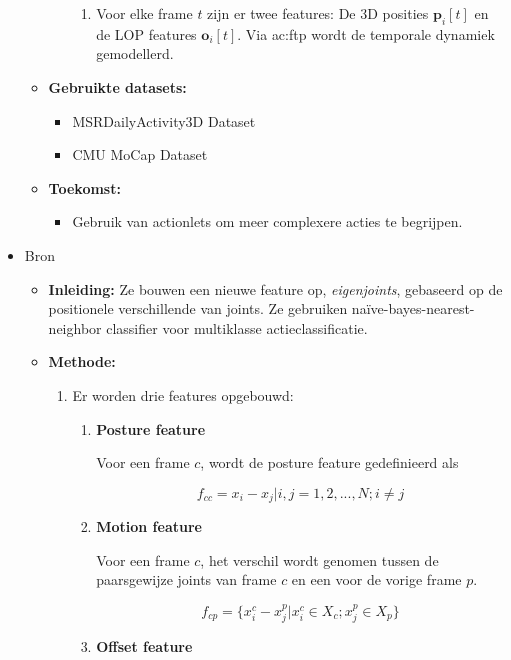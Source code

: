 \begin{itemize}
\begin{itemize}
\begin{enumerate}
\begin{enumerate}
 				\item Voor elke frame $t$ zijn er twee features: De 3D posities $\textbf{p}_i[t]$ en de LOP features $\textbf{o}_i[t]$. Via \gls{ac:ftp} wordt de temporale dynamiek gemodellerd.
 			\end{enumerate} 
		\end{enumerate}
		\item \textbf{Gebruikte datasets:}
		\begin{itemize}
			\item MSRDailyActivity3D Dataset
			\item CMU MoCap Dataset
		\end{itemize}
		\item \textbf{Toekomst:}
		\begin{itemize}
			\item Gebruik van actionlets om meer complexere acties te begrijpen.
		\end{itemize}
	\end{itemize}
	
	\item Bron \cite{Yang2012}
	\begin{itemize}
		\item \textbf{Inleiding:} Ze bouwen een nieuwe feature op, \textit{eigenjoints}, gebaseerd op de positionele verschillende van joints. Ze gebruiken naïve-bayes-nearest-neighbor classifier voor multiklasse actieclassificatie.
		\item \textbf{Methode:}
		\begin{enumerate}
			
			\item Er worden drie features opgebouwd:
			\begin{enumerate}
				\item \textbf{Posture feature}
				
				Voor een frame $c$, wordt de posture feature gedefinieerd als
				
				$$f_{cc} = {x_i - x_j | i,j=1,2,...,N; i\neq j}$$
				
				\item \textbf{Motion feature}
				
				Voor een frame $c$, het verschil wordt genomen tussen de paarsgewijze joints van frame $c$ en een voor de vorige frame $p$.
				
				$$f_{cp} = \{x_i^c - x_j^p | x_i^c \in X_c; x_j^p \in X_p\}$$
					
				\item \textbf{Offset feature}
				

\end{enumerate}
\end{enumerate}
\end{itemize}
\end{itemize}

